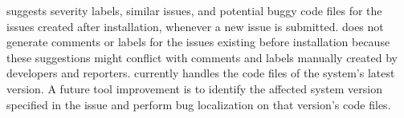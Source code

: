 \toolname suggests severity labels, similar issues, and potential buggy code files for the issues created after installation, whenever a new issue is submitted.  
\toolname does not generate comments or labels for the issues existing before installation because these suggestions might conflict with comments and labels manually created by developers and reporters. 
\toolname currently handles the code files of the system's latest version. A future tool improvement is to identify the affected system version specified in the issue and perform bug localization on that version's code files.





